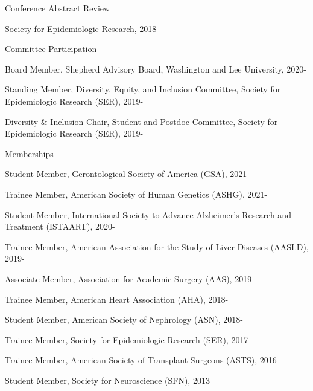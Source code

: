 \documentclass[10pt]{article}
\renewcommand{\section}[1]{\pagebreak[3]%
    \vspace{1.3\baselineskip}%
    \phantomsection\addcontentsline{toc}{section}{#1}%
    \noindent\llap{\scshape\smash{\parbox[t]{\marginparwidth}{\hyphenpenalty=10000\raggedright #1}}}%
    \vspace{-\baselineskip}\par}
\begin{document}
\vspace{2mm}

Conference Abstract Review

\begin{innerlist}

\item Society for Epidemiologic Research, 2018-

\end{innerlist}

\vspace{2mm}

Committee Participation

\begin{innerlist}

\item Board Member, Shepherd Advisory Board, Washington and Lee University, 2020-
\item Standing Member, Diversity, Equity, and Inclusion Committee, Society for Epidemiologic Research (SER), 2019-
\item Diversity \& Inclusion Chair, Student and Postdoc Committee, Society for Epidemiologic Research (SER), 2019-

\end{innerlist}

\vspace{2mm}

Memberships

\begin{innerlist}

\item Student Member, Gerontological Society of America (GSA), 2021-
\item Trainee Member, American Society of Human Genetics (ASHG), 2021-
\item Student Member, International Society to Advance Alzheimer's Research and Treatment (ISTAART), 2020-
\item Trainee Member, American Association for the Study of
  Liver Diseases (AASLD), 2019-
\item Associate Member, Association for Academic Surgery (AAS), 2019-
\item Trainee Member, American Heart Association (AHA), 2018-
\item Student Member, American Society of Nephrology (ASN), 2018-
\item Trainee Member, Society for Epidemiologic Research (SER), 2017-
\item Trainee Member, American Society of Transplant Surgeons (ASTS), 2016-
\item Student Member, Society for Neuroscience (SFN), 2013

\end{innerlist}

\end{document}
